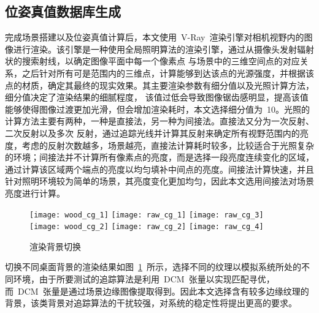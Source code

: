 \subsection{位姿真值数据库生成}
\label{sec:dataset_compare}
完成场景搭建以及位姿真值计算后，本文使用~V-Ray~渲染引擎对相机视野内的图像进行渲染。该引擎是一种使用全局照明算法的渲染引擎，通过从摄像头发射辐射状的搜索射线，以确定图像平面中每一个像素点
与场景中的三维空间点的对应关系，之后针对所有可是范围内的三维点，计算能够到达该点的光源强度，并根据该点的材质，确定其最终的现实效果。其主要渲染参数有细分值以及光照计算方法，细分值决定了渲染结果的细腻程度，
该值过低会导致图像锯齿感明显，提高该值能够使得图像过渡更加光滑，但会增加渲染耗时，本文选择细分值为~10。光照的计算方法主要有两种，一种是直接法，另一种为间接法。直接法又分为一次反射、二次反射以及多次
反射，通过追踪光线并计算其反射来确定所有视野范围内的亮度，考虑的反射次数越多，场景越亮，直接法计算耗时较多，比较适合于光照复杂的环境；间接法并不计算所有像素点的亮度，而是选择一段亮度连续变化的区域，
通过计算该区域两个端点的亮度以均匀填补中间点的亮度。间接法计算快速，并且针对照明环境较为简单的场景，其亮度变化更加均匀，因此本文选用间接法对场景亮度进行计算。 
\begin{figure}[t] %
  \centering%
    \texttt{[image: wood\_cg\_1]}
    \texttt{[image: raw\_cg\_1]}
    \texttt{[image: raw\_cg\_3]}
    \vskip 1.5pt
    \texttt{[image: wood\_cg\_2]}
    \texttt{[image: raw\_cg\_2]}
    \texttt{[image: raw\_cg\_4]}
  \caption{渲染背景切换}
  \label{fig:chap03:change_bkg_img}
  \end{figure}

  \begin{comment}
  \begin{figure}[t] %
    \centering%
      \texttt{[image: tiplier70]}
      \texttt{[image: tiplier130]}
      \texttt{[image: tiplier210]}
      \texttt{[image: tiplier300]}
    \caption{光照改变示意图}
    \label{fig:chap03:change_ray}
    \end{figure}
    之后本文还调整了场景的光源强度以渲染不同光照下的视频数据，如图~\ref{fig:chap03:change_ray}~所示，
该数据将被用于测试光照强度对追踪算法的影响。
  \end{comment}

切换不同桌面背景的渲染结果如图~\ref{fig:chap03:change_bkg_img}~所示，选择不同的纹理以模拟系统所处的不同环境，由于所要测试的追踪算法是利用~DCM~张量以实现匹配寻优，
而~DCM~张量是通过场景边缘图像提取得到。因此本文选择含有较多边缘纹理的背景，该类背景对追踪算法的干扰较强，对系统的稳定性将提出更高的要求。

